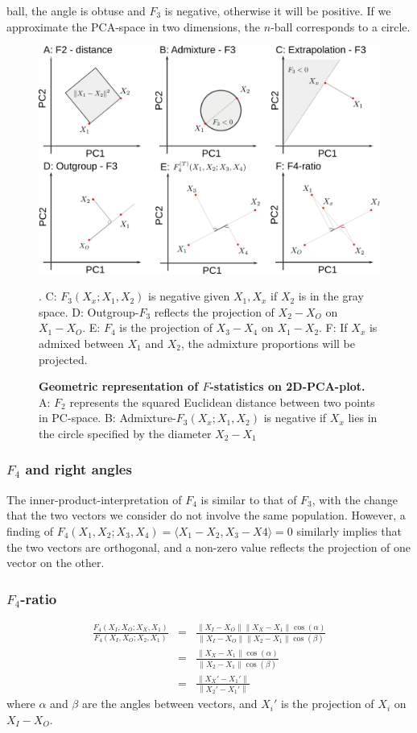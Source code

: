 \documentclass[12pt,a4pape, fullpage]{article}
\newcommand{\norm}[1]{\left\lVert#1\right\rVert}
\begin{document}
ball, the angle is obtuse and $F_3$ is negative, otherwise it will be positive. If we approximate the PCA-space in two dimensions, the $n$-ball corresponds to a circle. 

\begin{figure}[!ht]
	\includegraphics[width=\textwidth]{dummy_pca.png}
	\caption{\textbf{Geometric representation of $F$-statistics on 2D-PCA-plot.} A: $F_2$ represents the squared Euclidean distance between two points in PC-space. B: Admixture-$F_3(X_x; X_1, X_2)$ is negative if $X_x$ lies in the circle specified by the diameter $X_2-X_1$}. C: $F_3(X_x; X_1, X_2)$ is negative given $X_1, X_x$ if $X_2$ is in the gray space.  D: Outgroup-$F_3$ reflects the projection of $X_2 - X_O$ on $X_1 - X_O$. E: $F_4$ is the projection of $X_3 - X_4$ on $X_1-X_2$. F: If $X_x$ is admixed between $X_1$ and $X_2$, the admixture proportions will be projected.
\end{figure}

\subsubsection{$F_4$ and right angles}
The inner-product-interpretation of $F_4$ is similar to that of $F_3$, with the change that the two vectors we consider do not involve the same population. However, a finding of $F_4(X_1, X_2; X_3, X_4) = \langle X_1 - X_2, X_3 - X4 \rangle = 0$ similarly implies that the two vectors are orthogonal, and a non-zero value reflects the projection of one vector on the other.

\subsubsection{$F_4$-ratio}
\begin{eqnarray}
\frac{F_4(X_I, X_O; X_X, X_1)}{F_4(X_I, X_O; X_2, X_1)} &=& \frac{\norm{X_I-X_O}\norm{X_X-X_1}\cos(\alpha)}{\norm{X_I-X_O}\norm{X_2-X_1}\cos(\beta)}\nonumber\\
&=&\frac{\norm{X_X-X_1}\cos(\alpha)}{\norm{X_2-X_1}\cos(\beta)}\nonumber\\
&=& \frac{\norm{X_X' - X_1'}}{\norm{X_2' - X_1'}}
\end{eqnarray}
where $\alpha$ and $\beta$ are the angles between vectors, and $X_i'$ is the projection of $X_i$ on $X_I-X_O$.
\end{document}
